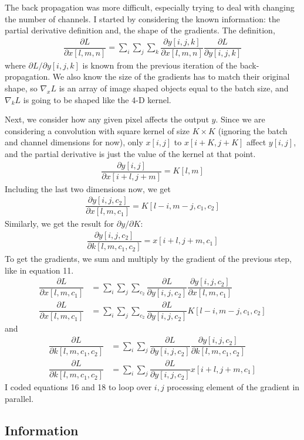 \documentclass{article}
\newcommand{\info}{\clearpage \subsection*{Information}}
\begin{document}
The back propagation was more difficult, especially trying to deal with changing the number of channels. I started by considering the known information: the partial derivative definition and, the shape of the gradients. The definition,
\begin{align}
	\dfrac{\partial L}{\partial x [l,m,n]} = \sum_i \sum_j \sum_k \dfrac{\partial y[i,j,k]}{\partial x[l,m,n]} \dfrac{\partial L}{\partial y[i,j,k]}
\end{align}
where $\partial L /\partial y[i,j,k] $ is known from the previous iteration of the back-propagation. We also know the size of the gradients has to match their original shape, so $\nabla_x L$ is an array of image shaped objects equal to the batch size, and $\nabla_k L$ is going to be shaped like the 4-D kernel.

Next, we consider how any given pixel affects the output $y$. Since we are considering a convolution with square kernel of size $K\times K$ (ignoring the batch and channel dimensions for now), only $x[i,j]$ to $x[i+K,j+K]$ affect $y[i,j]$, and the partial derivative is just the value of the kernel at that point. 
\begin{align}
	\dfrac{\partial y[i,j]}{\partial x[i+l,j+m]} = K[l,m]
\end{align}
Including the last two dimensions now, we get 
\begin{align}
	\dfrac{\partial y[i,j,c_2]}{\partial x[l,m, c_1]} = K[l-i,m-j,c_1,c_2]
\end{align}
Similarly, we get the result for $\partial y / \partial K$:
\begin{align}
	\dfrac{\partial y[i,j,c_2]}{\partial k[l,m, c_1, c_2]} = x[i+l,j+m,c_1]	
\end{align}
To get the gradients, we sum and multiply by the gradient of the previous step, like in equation 11.
\begin{align}
	\dfrac{\partial L}{\partial x [l,m,c_1]} &= \sum_i \sum_j \sum_{c_2}\dfrac{\partial L}{\partial y[i,j,c_2]} \dfrac{\partial y[i,j,c_2]}{\partial x[l,m,c_1]}  \\
	\dfrac{\partial L}{\partial x [l,m,c_1]} &= \sum_i \sum_j \sum_{c_2} \dfrac{\partial L}{\partial y[i,j,c_2]} 	K[l-i,m-j,c_1,c_2] 
\end{align}
and
\begin{align}
	\dfrac{\partial L}{\partial k [l,m,c_1,c_2]} &= \sum_i \sum_j \dfrac{\partial L}{\partial y[i,j,c_2]} \dfrac{\partial y[i,j,c_2]}{\partial k[l,m,c_1,c_2]}  \\
	\dfrac{\partial L}{\partial k [l,m,c_1,c_2]} &= \sum_i \sum_j \dfrac{\partial L}{\partial y[i,j,c_2]} x[i+l,j+m,c_1]	
\end{align}
I coded equations 16 and 18 to loop over $i,j$ processing element of the gradient in parallel. 
\info
\end{document}
